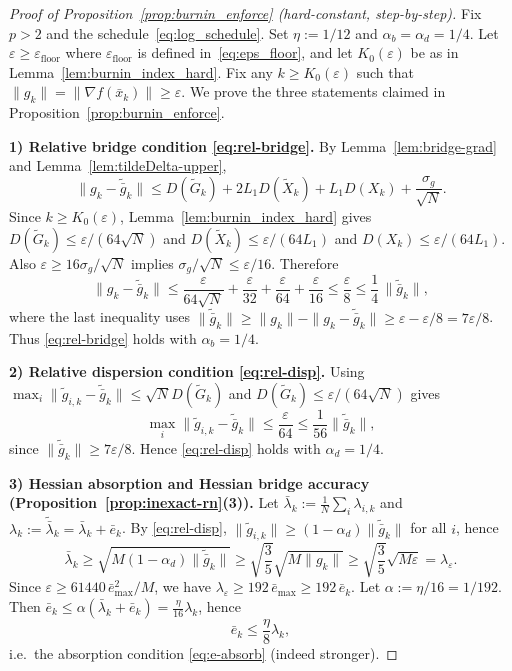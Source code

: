 \documentclass[11pt,a4paper]{article}
\begin{document}
\begin{proof}[Proof of Proposition~\ref{prop:burnin_enforce} (hard-constant, step-by-step)]
	Fix $p>2$ and the schedule~\eqref{eq:log_schedule}. Set $\eta:=1/12$ and $\alpha_b=\alpha_d=1/4$.
	Let $\varepsilon\ge \varepsilon_{\mathrm{floor}}$ where $\varepsilon_{\mathrm{floor}}$ is defined in~\eqref{eq:eps_floor},
	and let $K_0(\varepsilon)$ be as in Lemma~\ref{lem:burnin_index_hard}.
	Fix any $k\ge K_0(\varepsilon)$ such that $\|g_k\|=\|\nabla f(\bar x_k)\|\ge \varepsilon$.
	We prove the three statements claimed in Proposition~\ref{prop:burnin_enforce}.
	
	\smallskip
	\noindent\textbf{1) Relative bridge condition \eqref{eq:rel-bridge}.}
	By Lemma~\ref{lem:bridge-grad} and Lemma~\ref{lem:tildeDelta-upper},
	\[
	\|g_k-\tilde{\bar g}_k\|
	\le D(\tilde G_k)+2L_1D(\tilde X_k)+L_1D(X_k)+\frac{\sigma_g}{\sqrt N}.
	\]
	Since $k\ge K_0(\varepsilon)$, Lemma~\ref{lem:burnin_index_hard} gives
	$D(\tilde G_k)\le \varepsilon/(64\sqrt N)$ and $D(\tilde X_k)\le \varepsilon/(64L_1)$ and
	$D(X_k)\le \varepsilon/(64L_1)$. Also $\varepsilon\ge 16\sigma_g/\sqrt N$ implies $\sigma_g/\sqrt N\le \varepsilon/16$.
	Therefore
	\[
	\|g_k-\tilde{\bar g}_k\|
	\le \frac{\varepsilon}{64\sqrt N}+\frac{\varepsilon}{32}+\frac{\varepsilon}{64}+\frac{\varepsilon}{16}
	\le \frac{\varepsilon}{8}
	\le \frac14\,\|\tilde{\bar g}_k\|,
	\]
	where the last inequality uses $\|\tilde{\bar g}_k\|\ge \|g_k\|-\|g_k-\tilde{\bar g}_k\|\ge \varepsilon-\varepsilon/8=7\varepsilon/8$.
	Thus \eqref{eq:rel-bridge} holds with $\alpha_b=1/4$.
	
	\smallskip
	\noindent\textbf{2) Relative dispersion condition \eqref{eq:rel-disp}.}
	Using $\max_i\|\tilde g_{i,k}-\tilde{\bar g}_k\|\le \sqrt N D(\tilde G_k)$ and $D(\tilde G_k)\le \varepsilon/(64\sqrt N)$ gives
	\[
	\max_i\|\tilde g_{i,k}-\tilde{\bar g}_k\|\le \frac{\varepsilon}{64}\le \frac{1}{56}\|\tilde{\bar g}_k\|,
	\]
	since $\|\tilde{\bar g}_k\|\ge 7\varepsilon/8$. Hence \eqref{eq:rel-disp} holds with $\alpha_d=1/4$.
	
	\smallskip
	\noindent\textbf{3) Hessian absorption and Hessian bridge accuracy (Proposition~\ref{prop:inexact-rn}(3)).}
	Let $\bar\lambda_k:=\frac1N\sum_i\lambda_{i,k}$ and $\lambda_k:=\tilde{\bar\lambda}_k=\bar\lambda_k+\bar e_k$.
	By \eqref{eq:rel-disp}, $\|\tilde g_{i,k}\|\ge (1-\alpha_d)\|\tilde{\bar g}_k\|$ for all $i$, hence
	\[
	\bar\lambda_k\ge \sqrt{M(1-\alpha_d)\|\tilde{\bar g}_k\|}
	\ge \sqrt{\frac{3}{5}}\sqrt{M\|g_k\|}
	\ge \sqrt{\frac{3}{5}}\sqrt{M\varepsilon}
	=\lambda_\varepsilon.
	\]
	Since $\varepsilon\ge 61440\,\bar e_{\max}^2/M$, we have $\lambda_\varepsilon\ge 192\,\bar e_{\max}\ge 192\,\bar e_k$.
	Let $\alpha:=\eta/16=1/192$. Then $\bar e_k\le \alpha(\bar\lambda_k+\bar e_k)=\frac{\eta}{16}\lambda_k$, hence
	\[
	\bar e_k\le \frac{\eta}{8}\lambda_k,
	\]
	i.e.\ the absorption condition \eqref{eq:e-absorb} (indeed stronger).
	

\end{proof}
\end{document}
